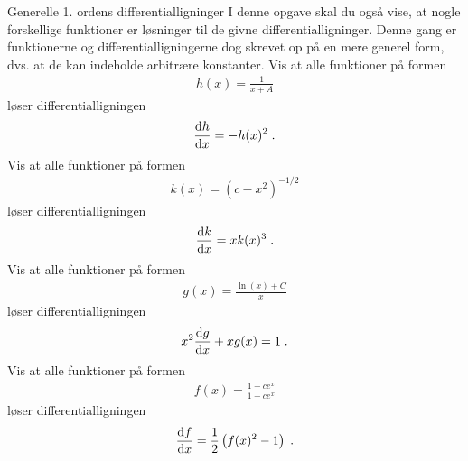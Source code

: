 \begin{opgave}[3]{Generelle 1. ordens differentialligninger}
I denne opgave skal du også vise, at nogle forskellige funktioner er løsninger til de givne differentialligninger. Denne gang er funktionerne og differentialligningerne dog skrevet op på en mere generel form, dvs. at de kan indeholde arbitrære konstanter.
\opg Vis at alle funktioner på formen
\begin{align*}
	h(x) = \frac{1}{x + A} 
\end{align*}
løser differentialligningen
\begin{align*}
	\dv{h}{x} = - h(x)^2 \; .
\end{align*}
\opg Vis at alle funktioner på formen
\begin{align*}
	k(x) = \left( c - x^2 \right)^{-1/2}
\end{align*}
løser differentialligningen
\begin{align*}
	\dv{k}{x} = x k(x)^3 \; .
\end{align*}
\opg Vis at alle funktioner på formen
\begin{align*}
	g(x) = \frac{\ln (x) + C}{x}
\end{align*}
løser differentialligningen
\begin{align*}
	x^2 \dv{g}{x} + xg(x) = 1 \; .
\end{align*} 
\opg Vis at alle funktioner på formen
\begin{align*}
	f(x) = \frac{1 + ce^x}{1-ce^x}
\end{align*}
løser differentialligningen
\begin{align*}
	\dv{f}{x} = \frac{1}{2} \left( f(x)^2 - 1 \right) \; .
\end{align*} 
\end{opgave}